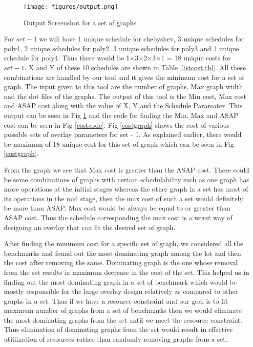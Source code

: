\begin{figure}[!h]
	\centering
	\texttt{[image: figures/output.png]}
	\caption{Output Screenshot for a set of graphs} %
	\label{costoutput}
\end{figure}

For $set - 1$ we will have 1 unique schedule for chebyshev, 3 unique schedules for poly1, 2 unique schedules for poly2, 3 unique schedules for poly3 and 1 unique schedule for poly4. Thus there would be 1$\times$3$\times$2$\times$3$\times$1 = 18 unique costs for $set - 1$. X and Y of these 10 schedules are shown in Table \ref{listcost.tbl}. All these combinations are handled by our tool and it gives the minimum cost for a set of graph. The input given to this tool are the number of graphs, Max graph width and the dot files of the graphs. The output of this tool is the Min cost, Max cost and ASAP cost along with the value of X, Y and the Schedule Paramater. This output can be seen in Fig \ref{costoutput} and the code for finding the Min, Max and ASAP cost can be seen in Fig \ref{costcode}. Fig \ref{costgraph} shows the cost of various possible sets of overlay parameters for set - 1. As explained earlier, there would be maximum of 18 unique cost for this set of graph which can be seen in Fig \ref{costgraph}. 

From the graph we see that Max cost is greater than the ASAP cost. There could be some combinations of graphs with certain schedulability such as one graph has more operations at the initial stages whereas the other graph in a set has most of its operations in the mid stage, then the max cost of such a set would definitely be more than ASAP. Max cost would be always be equal to or greater than ASAP cost. Thus the schedule corresponding the max cost is a worst way of designing an overlay that can fit the desired set of graph.



After finding the minimum cost for a specific set of graph, we considered all the benchmarks and found out the most dominating graph among the lot and then the cost after removing the same. Dominating graph is the one whose removal from the set results in maximum decrease in the cost of the set. This helped us in finding out the most dominating graph in a set of benchmark which would be mostly responsible for the large overlay design relatively as compared to other graphs in a set. Thus if we have a resource constraint and our goal is to fit maximum number of graphs from a set of benchmarks then we would eliminate the most dominating graphs from the set until we meet the resource constraint. Thus elimination of dominating graphs from the set would result in effective utitlization of resources rather than randomly removing graphs from a set. 

